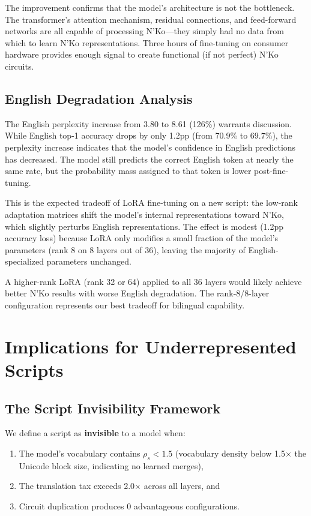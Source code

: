 \documentclass[11pt]{article}
\begin{document}
The improvement confirms that the model's architecture is not the bottleneck.
The transformer's attention mechanism, residual connections, and feed-forward networks are all capable of processing N'Ko---they simply had no data from which to learn N'Ko representations.
Three hours of fine-tuning on consumer hardware provides enough signal to create functional (if not perfect) N'Ko circuits.

\subsection{English Degradation Analysis}

The English perplexity increase from 3.80 to 8.61 (126\%) warrants discussion.
While English top-1 accuracy drops by only 1.2pp (from 70.9\% to 69.7\%), the perplexity increase indicates that the model's confidence in English predictions has decreased.
The model still predicts the correct English token at nearly the same rate, but the probability mass assigned to that token is lower post-fine-tuning.

This is the expected tradeoff of LoRA fine-tuning on a new script: the low-rank adaptation matrices shift the model's internal representations toward N'Ko, which slightly perturbs English representations.
The effect is modest (1.2pp accuracy loss) because LoRA only modifies a small fraction of the model's parameters (rank 8 on 8 layers out of 36), leaving the majority of English-specialized parameters unchanged.

A higher-rank LoRA (rank 32 or 64) applied to all 36 layers would likely achieve better N'Ko results with worse English degradation.
The rank-8/8-layer configuration represents our best tradeoff for bilingual capability.

\section{Implications for Underrepresented Scripts}
\label{sec:broader-scripts}

\subsection{The Script Invisibility Framework}

We define a script as \textbf{invisible} to a model when:
\begin{enumerate}
\item The model's vocabulary contains $\rho_s < 1.5$ (vocabulary density below 1.5$\times$ the Unicode block size, indicating no learned merges),
\item The translation tax exceeds 2.0$\times$ across all layers, and
\item Circuit duplication produces 0 advantageous configurations.
\end{enumerate}
\end{document}
